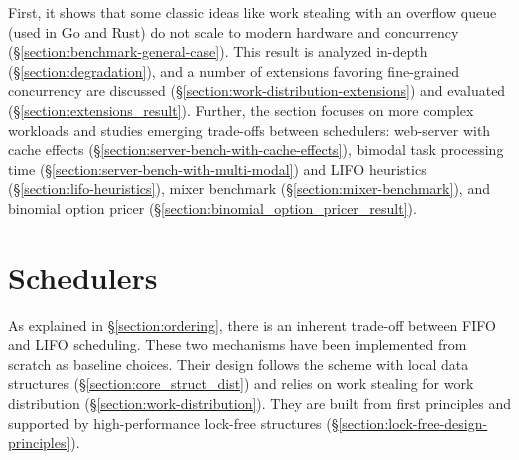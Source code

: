\documentclass[12pt,a4paper,twoside]{report}
\begin{document}
First, it shows that some classic ideas like work stealing with an overflow queue (used in Go and Rust) do not scale to modern hardware and concurrency (\S\ref{section:benchmark-general-case}). This result is analyzed in-depth (\S\ref{section:degradation}), and a number of extensions favoring fine-grained concurrency are discussed (\S\ref{section:work-distribution-extensions}) and evaluated (\S\ref{section:extensions_result}). Further, the section focuses on more complex workloads and studies emerging trade-offs between schedulers: web-server with cache effects (\S\ref{section:server-bench-with-cache-effects}), bimodal task processing time (\S\ref{section:server-bench-with-multi-modal}) and LIFO heuristics (\S\ref{section:lifo-heuristics}), mixer benchmark (\S\ref{section:mixer-benchmark}), and binomial option pricer (\S\ref{section:binomial_option_pricer_result}).

\section{Schedulers}
\label{section:impl-schedulers}
As explained in \S\ref{section:ordering}, there is an inherent trade-off between FIFO and LIFO scheduling. These two mechanisms have been implemented from scratch as baseline choices. Their design follows the scheme with local data structures (\S\ref{section:core_struct_dist}) and relies on work stealing for work distribution (\S\ref{section:work-distribution}). They are built from first principles and supported by high-performance lock-free structures (\S\ref{section:lock-free-design-principles}). 
\end{document}
